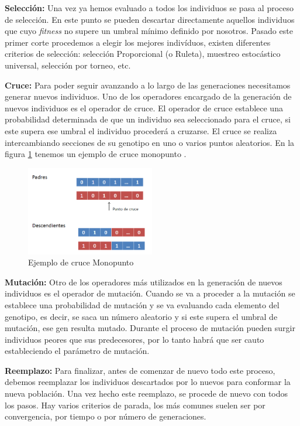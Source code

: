 \textbf{Selección:} Una vez ya hemos evaluado a todos los individuos se pasa al proceso de selección. En este punto se pueden descartar directamente aquellos individuos que cuyo \emph{fitness} no supere un umbral mínimo definido por nosotros. Pasado este primer corte procedemos a elegir los mejores indivíduos, existen diferentes criterios de selección: selección Proporcional (o Ruleta), muestreo estocástico universal, selección por torneo, etc.

\textbf{Cruce:} Para poder seguir avanzando a lo largo de las generaciones necesitamos generar nuevos individuos. Uno de los operadores encargado de la generación de nuevos individuos es el operador de cruce. El operador de cruce establece una probabilidad determinada de que un individuo sea seleccionado para el cruce, si este supera ese umbral el individuo procederá a cruzarse. El cruce se realiza intercambiando secciones de su genotipo en uno o varios puntos aleatorios. En la figura \ref{cruce_monopunto} tenemos un ejemplo de cruce monopunto \cite{cruce_monopunto}.

\begin{figure}[h]
  \centering
  \includegraphics[width=0.5\textwidth]{../img/cruce_monopunto}\caption{Ejemplo de cruce Monopunto}\label{cruce_monopunto}
\end{figure}



\textbf{Mutación:} Otro de los operadores más utilizados en la generación de nuevos individuos es el operador de mutación. Cuando se va a proceder a la mutación se establece una probabilidad de mutación y se va evaluando cada elemento del genotipo, es decir, se saca un número aleatorio y si este supera el umbral de mutación, ese gen resulta mutado. Durante el proceso de mutación pueden surgir individuos peores que sus predecesores, por lo tanto habrá que ser cauto estableciendo el parámetro de mutación.

\textbf{Reemplazo:} Para finalizar, antes de comenzar de nuevo todo este proceso, debemos reemplazar los individuos descartados por lo nuevos para conformar la nueva población. Una vez hecho este reemplazo, se procede de nuevo con todos los pasos. Hay varios criterios de parada, los más comunes suelen ser por convergencia, por tiempo o por número de generaciones.




